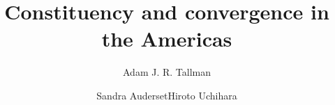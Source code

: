 \title{Constituency and convergence in the Americas}
\author{Adam J. R. Tallman\and Sandra Auderset\lastand Hiroto Uchihara}
\renewcommand{\lsSeries}{tpd}%
\renewcommand{\lsSeriesNumber}{1}
